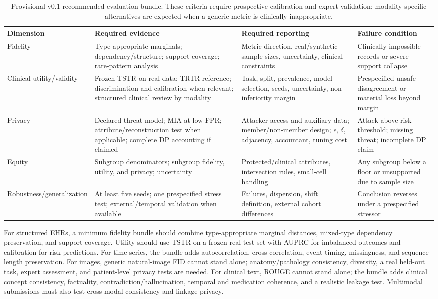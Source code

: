 \documentclass[11pt,letterpaper]{article}
\begin{document}
\begin{table}[t]
\centering
\caption{Provisional v0.1 recommended evaluation bundle. These criteria require prospective calibration and expert validation; modality-specific alternatives are expected when a generic metric is clinically inappropriate.}
\label{tab:bundle}
\small
\setlength{\tabcolsep}{4pt}
\begin{tabular}{P{2.8cm}P{4.3cm}P{4.0cm}P{4.0cm}}
\toprule
Dimension & Required evidence & Required reporting & Failure condition \\
\midrule
Fidelity & Type-appropriate marginals; dependency/structure; support coverage; rare-pattern analysis & Metric direction, real/synthetic sample sizes, uncertainty, clinical constraints & Clinically impossible records or severe support collapse \\
Clinical utility/\allowbreak validity & Frozen TSTR on real data; TRTR reference; discrimination and calibration when relevant; structured clinical review by modality & Task, split, prevalence, model selection, seeds, uncertainty, non-inferiority margin & Prespecified unsafe disagreement or material loss beyond margin \\
Privacy & Declared threat model; MIA at low FPR; attribute/reconstruction test when applicable; complete DP accounting if claimed & Attacker access and auxiliary data; member/non-member design; $\epsilon$, $\delta$, adjacency, accountant, tuning cost & Attack above risk threshold; missing threat; incomplete DP claim \\
Equity & Subgroup denominators; subgroup fidelity, utility, and privacy; uncertainty & Protected/clinical attributes, intersection rules, small-cell handling & Any subgroup below a floor or unsupported due to sample size \\
Robustness/\allowbreak generalization & At least five seeds; one prespecified stress test; external/temporal validation when available & Failures, dispersion, shift definition, external cohort differences & Conclusion reverses under a prespecified stressor \\
\bottomrule
\end{tabular}
\end{table}

For structured EHRs, a minimum fidelity bundle should combine type-appropriate marginal distances, mixed-type dependency preservation, and support coverage. Utility should use TSTR on a frozen real test set with AUPRC for imbalanced outcomes and calibration for risk predictions. For time series, the bundle adds autocorrelation, cross-correlation, event timing, missingness, and sequence-length preservation. For images, generic natural-image FID cannot stand alone; anatomy/pathology consistency, diversity, a real held-out task, expert assessment, and patient-level privacy tests are needed. For clinical text, ROUGE cannot stand alone; the bundle adds clinical concept consistency, factuality, contradiction/hallucination, temporal and medication coherence, and a realistic leakage test. Multimodal submissions must also test cross-modal consistency and linkage privacy.
\end{document}
